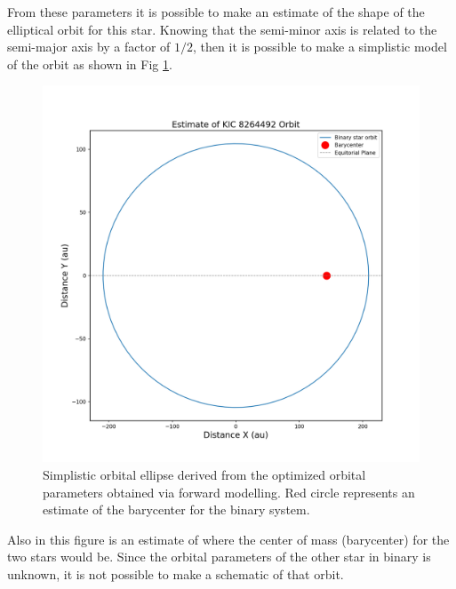 \documentclass[]{article}
\begin{document}
\noindent
From these parameters it is possible to make an estimate of the shape of the elliptical orbit for this star. Knowing that the semi-minor axis is related to the semi-major axis by a factor of $1/2$, then it is possible to make a simplistic model of the orbit as shown in Fig \ref{fig:Orbit}.

\begin{figure}[H]
    \centering
    \includegraphics[width=1\linewidth]{orbit.png}
    \caption{Simplistic orbital ellipse derived from the optimized orbital parameters obtained via forward modelling. Red circle represents an estimate of the barycenter for the binary system.}
    \label{fig:Orbit}
\end{figure}
\noindent
Also in this figure is an estimate of where the center of mass (barycenter) for the two stars would be.
Since the orbital parameters of the other star in binary is unknown, it is not possible to make a schematic of that orbit.
\end{document}
